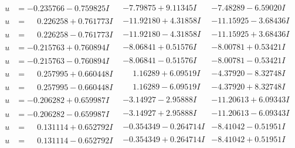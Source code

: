 \documentclass[1p]{elsarticle_modified}
\theoremstyle{definition}
\begin{document}
$$\begin{array}{c|c|c}
\begin{aligned}
u &= -0.235766 - 0.759825 I\end{aligned}
 & -7.79875 + 9.11345 I & -7.48289 - 6.59020 I \\ \hline\begin{aligned}
u &= \phantom{-}0.226258 + 0.761773 I\end{aligned}
 & -11.92180 + 4.31858 I & -11.15925 - 3.68436 I \\ \hline\begin{aligned}
u &= \phantom{-}0.226258 - 0.761773 I\end{aligned}
 & -11.92180 - 4.31858 I & -11.15925 + 3.68436 I \\ \hline\begin{aligned}
u &= -0.215763 + 0.760894 I\end{aligned}
 & -8.06841 + 0.51576 I & -8.00781 + 0.53421 I \\ \hline\begin{aligned}
u &= -0.215763 - 0.760894 I\end{aligned}
 & -8.06841 - 0.51576 I & -8.00781 - 0.53421 I \\ \hline\begin{aligned}
u &= \phantom{-}0.257995 + 0.660448 I\end{aligned}
 & \phantom{-}1.16289 + 6.09519 I & -4.37920 - 8.32748 I \\ \hline\begin{aligned}
u &= \phantom{-}0.257995 - 0.660448 I\end{aligned}
 & \phantom{-}1.16289 - 6.09519 I & -4.37920 + 8.32748 I \\ \hline\begin{aligned}
u &= -0.206282 + 0.659987 I\end{aligned}
 & -3.14927 - 2.95888 I & -11.20613 + 6.09343 I \\ \hline\begin{aligned}
u &= -0.206282 - 0.659987 I\end{aligned}
 & -3.14927 + 2.95888 I & -11.20613 - 6.09343 I \\ \hline\begin{aligned}
u &= \phantom{-}0.131114 + 0.652792 I\end{aligned}
 & -0.354349 - 0.264714 I & -8.41042 - 0.51951 I \\ \hline\begin{aligned}
u &= \phantom{-}0.131114 - 0.652792 I\end{aligned}
 & -0.354349 + 0.264714 I & -8.41042 + 0.51951 I \\ \hline\begin{aligned}

\end{aligned}
\end{array}$$
\end{document}
